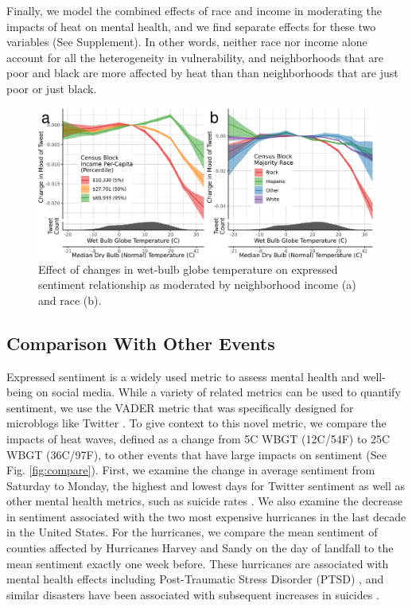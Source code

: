 \documentclass[fleqn,10pt]{wlscirep}
\begin{document}
Finally, we model the combined effects of race and income in moderating the impacts of heat on mental health, and we find separate effects for these two variables (See Supplement).  In other words, neither race nor income alone account for all the heterogeneity in vulnerability, and neighborhoods that are poor and black are more affected by heat than than neighborhoods that are just poor or just black.

\begin{figure}[H]
\centering
  \includegraphics[width=\linewidth]{../res/wbgt_combined.png}
    \caption{Effect of changes in wet-bulb globe temperature on expressed sentiment relationship as moderated by neighborhood income (a) and race (b).}
\label{fig:hetero}
\end{figure}


\subsection*{Comparison With Other Events}

Expressed sentiment is a widely used metric to assess mental health and well-being on social media.  While a variety of related metrics can be used to quantify sentiment, we use the VADER metric that was specifically designed for microblogs like Twitter \cite{hutto2014vader}.  To give context to this novel metric, we compare the impacts of heat waves, defined as a change from 5\textdegree C WBGT (12\textdegree C/54\textdegree F) to 25\textdegree C WBGT (36\textdegree C/97\textdegree F), to other events that have large impacts on sentiment (See Fig. \ref{fig:compare}).  First, we examine the change in average sentiment from Saturday to Monday, the highest and lowest days for Twitter sentiment as well as other mental health metrics, such as suicide rates \cite{CDC2021}.  We also examine the decrease in sentiment associated with the two most expensive hurricanes in the last decade in the United States.  For the hurricanes, we compare the mean sentiment of counties affected by Hurricanes Harvey and Sandy on the day of landfall to the mean sentiment exactly one week before.  These hurricanes are associated with mental health effects including Post-Traumatic Stress Disorder (PTSD) \cite{Schwartz2017Aug, Schwartz2018May}, and similar disasters have been associated with subsequent increases in suicides \cite{Krug1998Feb}.
\end{document}
